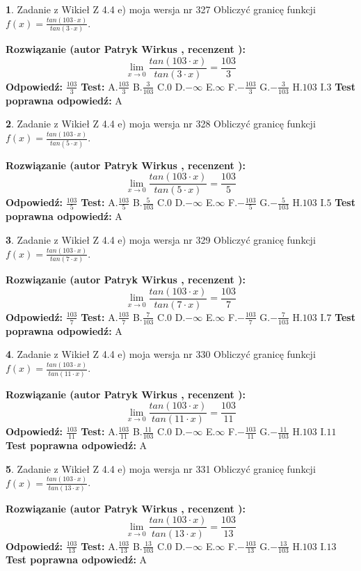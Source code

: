 \documentclass[12pt, a4paper]{article}
\theoremstyle{definition} %
\newtheorem{zad}{}
\newcommand{\zadStart}[1]{\begin{zad}#1\newline}
\newcommand{\zadStop}{\end{zad}}
\newcommand{\rozwStart}[2]{\noindent \textbf{Rozwiązanie (autor #1 , recenzent #2): }\newline}
\newcommand{\rozwStop}{\newline}
\newcommand{\odpStart}{\noindent \textbf{Odpowiedź:}\newline}
\newcommand{\odpStop}{\newline}
\newcommand{\testStart}{\noindent \textbf{Test:}\newline}
\newcommand{\testStop}{\newline}
\newcommand{\kluczStart}{\noindent \textbf{Test poprawna odpowiedź:}\newline}
\newcommand{\kluczStop}{\newline}
\begin{document}
\zadStart{Zadanie z Wikieł Z 4.4 e) moja wersja nr 327}
Obliczyć granicę funkcji $f(x)=\frac{tan(103\cdot x)}{tan(3\cdot x)}$.
\zadStop
\rozwStart{Patryk Wirkus}{}
$$\lim\limits_{x\to 0}\frac{tan(103\cdot x)}{tan(3\cdot x)}=
\frac{103}{3}$$
\rozwStop
\odpStart
$\frac{103}{3}$
\odpStop
\testStart
A.$\frac{103}{3}$
B.$\frac{3}{103}$
C.$0$
D.$-\infty$
E.$\infty$
F.$-\frac{103}{3}$
G.$-\frac{3}{103}$
H.$103$
I.$3$
\testStop
\kluczStart
A
\kluczStop



\zadStart{Zadanie z Wikieł Z 4.4 e) moja wersja nr 328}
Obliczyć granicę funkcji $f(x)=\frac{tan(103\cdot x)}{tan(5\cdot x)}$.
\zadStop
\rozwStart{Patryk Wirkus}{}
$$\lim\limits_{x\to 0}\frac{tan(103\cdot x)}{tan(5\cdot x)}=
\frac{103}{5}$$
\rozwStop
\odpStart
$\frac{103}{5}$
\odpStop
\testStart
A.$\frac{103}{5}$
B.$\frac{5}{103}$
C.$0$
D.$-\infty$
E.$\infty$
F.$-\frac{103}{5}$
G.$-\frac{5}{103}$
H.$103$
I.$5$
\testStop
\kluczStart
A
\kluczStop



\zadStart{Zadanie z Wikieł Z 4.4 e) moja wersja nr 329}
Obliczyć granicę funkcji $f(x)=\frac{tan(103\cdot x)}{tan(7\cdot x)}$.
\zadStop
\rozwStart{Patryk Wirkus}{}
$$\lim\limits_{x\to 0}\frac{tan(103\cdot x)}{tan(7\cdot x)}=
\frac{103}{7}$$
\rozwStop
\odpStart
$\frac{103}{7}$
\odpStop
\testStart
A.$\frac{103}{7}$
B.$\frac{7}{103}$
C.$0$
D.$-\infty$
E.$\infty$
F.$-\frac{103}{7}$
G.$-\frac{7}{103}$
H.$103$
I.$7$
\testStop
\kluczStart
A
\kluczStop



\zadStart{Zadanie z Wikieł Z 4.4 e) moja wersja nr 330}
Obliczyć granicę funkcji $f(x)=\frac{tan(103\cdot x)}{tan(11\cdot x)}$.
\zadStop
\rozwStart{Patryk Wirkus}{}
$$\lim\limits_{x\to 0}\frac{tan(103\cdot x)}{tan(11\cdot x)}=
\frac{103}{11}$$
\rozwStop
\odpStart
$\frac{103}{11}$
\odpStop
\testStart
A.$\frac{103}{11}$
B.$\frac{11}{103}$
C.$0$
D.$-\infty$
E.$\infty$
F.$-\frac{103}{11}$
G.$-\frac{11}{103}$
H.$103$
I.$11$
\testStop
\kluczStart
A
\kluczStop



\zadStart{Zadanie z Wikieł Z 4.4 e) moja wersja nr 331}
Obliczyć granicę funkcji $f(x)=\frac{tan(103\cdot x)}{tan(13\cdot x)}$.
\zadStop
\rozwStart{Patryk Wirkus}{}
$$\lim\limits_{x\to 0}\frac{tan(103\cdot x)}{tan(13\cdot x)}=
\frac{103}{13}$$
\rozwStop
\odpStart
$\frac{103}{13}$
\odpStop
\testStart
A.$\frac{103}{13}$
B.$\frac{13}{103}$
C.$0$
D.$-\infty$
E.$\infty$
F.$-\frac{103}{13}$
G.$-\frac{13}{103}$
H.$103$
I.$13$
\testStop
\kluczStart
A
\kluczStop
\end{document}
